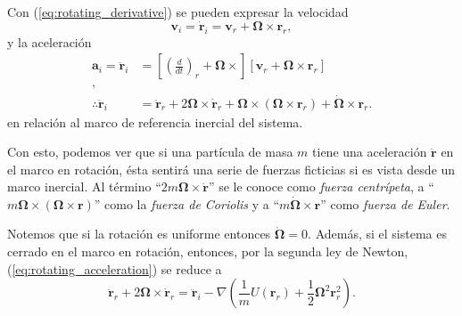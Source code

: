 Con (\ref{eq:rotating_derivative}) se pueden expresar la velocidad
\begin{equation}
 \mathbf{v}_i = \dot{\mathbf{r}}_i = \mathbf{v}_r + \mathbf{\Omega} \times \mathbf{r}_r,
 \label{eq:rotating_velocity}
\end{equation}
y la aceleración
\begin{align}
 \mathbf{a}_i = \ddot{\mathbf{r}}_i &= \left[ \left( \frac{d}{dt}\right)_r + \mathbf{\Omega} \times \right]\left[ \mathbf{v}_r + \mathbf{\Omega} \times \mathbf{r}_r \right] \nonumber \\
 \nonumber, \\
 \therefore \ddot{\mathbf{r}}_i &= \ddot{\mathbf{r}}_r + 2\mathbf{\Omega} \times \mathbf{\dot{r}}_r + \mathbf{\Omega} \times \left( \mathbf{\Omega} \times \mathbf{r}_r \right) + \dot{\mathbf{\Omega}} \times \mathbf{r}_r.
 \label{eq:rotating_acceleration}
\end{align}
en relación al marco de referencia inercial del sistema.

Con esto, podemos ver que si una partícula de masa $m$ tiene una aceleración $\ddot{\mathbf{r}}$ en el marco en rotación, ésta sentirá una serie de fuerzas ficticias si es vista desde un marco inercial. Al término ``$2 m \mathbf{\Omega} \times \dot{\mathbf{r}}$'' se le conoce como \textit{fuerza centrípeta}, a ``$m \mathbf{\Omega} \times ( \mathbf{\Omega} \times \mathbf{r} )$'' como la \textit{fuerza de Coriolis} y a ``$m \dot{\mathbf{\Omega}} \times \mathbf{r}$'' como \textit{fuerza de Euler}.

Notemos que si la rotación es uniforme entonces $\dot{\mathbf{\Omega}} = 0$. Además, si el sistema es cerrado en el marco en rotación, entonces, por la segunda ley de Newton, (\ref{eq:rotating_acceleration}) se reduce a
\begin{equation}
 \ddot{\mathbf{r}}_r + 2\mathbf{\Omega} \times \dot{\mathbf{r}}_r = \ddot{\mathbf{r}}_i - \nabla \left( \frac{1}{m}U(\mathbf{r}_r) +  \frac{1}{2} \mathbf{\Omega}^2 \mathbf{r}_r^2 \right).
 \label{eq:rotating_constant_acceleration}
\end{equation}



